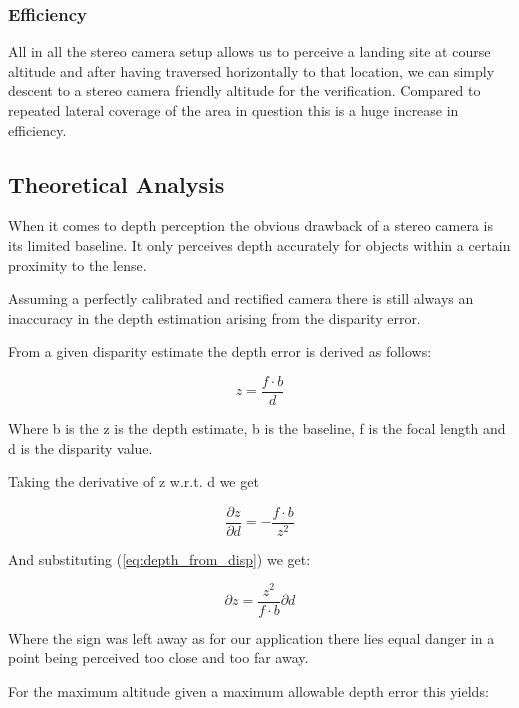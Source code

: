 \subsubsection{Efficiency}

All in all the stereo camera setup allows us to perceive a landing site at course altitude and after having traversed horizontally to that location, we can simply descent to a stereo camera friendly altitude for the verification. Compared to repeated lateral coverage of the area in question this is a huge increase in efficiency.

\subsection{Theoretical Analysis}

When it comes to depth perception the obvious drawback of a stereo camera is its limited baseline. It only perceives depth accurately for objects within a certain proximity to the lense. 

Assuming a perfectly calibrated and rectified camera there is still always an inaccuracy in the depth estimation arising from the disparity error.

From a given disparity estimate the depth error is derived as follows:

\begin{equation}\label{eq:depth_from_disp}
    z = \frac{f \cdot b}{d}
\end{equation}

Where b is the z is the depth estimate, b is the baseline, f is the focal length and d is the disparity value.

Taking the derivative of z w.r.t. d we get

\begin{equation}
    \frac{\partial z}{\partial d} = - \frac{f  \cdot b}{z^2}
\end{equation}

And substituting (\cref{eq:depth_from_disp}) we get:

\begin{equation}
    {\partial z} = \frac{z^2}{f  \cdot b}\partial d
\end{equation}

Where the sign was left away as for our application there lies equal danger in a point being perceived too close and too far away.

For the maximum altitude given a maximum allowable depth error this yields:

